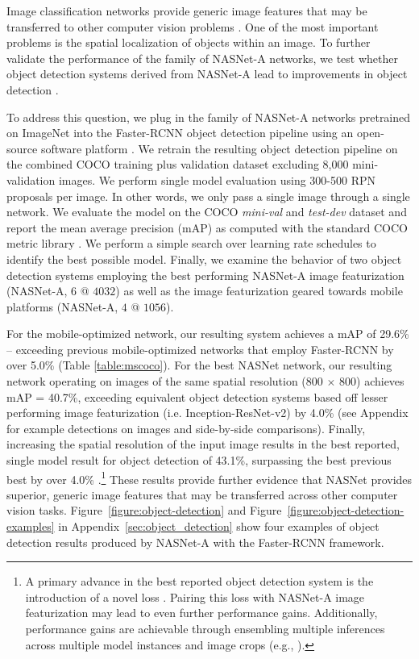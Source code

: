 \documentclass[10pt,twocolumn,letterpaper]{article}
\begin{document}
Image classification networks provide generic image features that may be transferred to other computer vision problems \cite{donahue2014decaf}. One of the most important problems is the spatial localization of objects within an image. To further validate the  performance of the family of NASNet-A networks, we test whether object detection systems derived from NASNet-A lead to improvements in object detection \cite{huang2016speed}.

To address this question, we plug in the family of NASNet-A networks pretrained on ImageNet into the Faster-RCNN object detection pipeline \cite{faster_rcnn} using an open-source software platform \cite{huang2016speed}. We retrain the resulting object detection pipeline on the combined COCO training plus validation dataset excluding 8,000 mini-validation images.
We perform single model evaluation using 300-500 RPN proposals per image. In other words, we only
pass a single image through a single network. We evaluate the model on the COCO {\it mini-val}\cite{huang2016speed} and {\it test-dev} dataset and report the mean average precision (mAP) as computed with the standard COCO metric library \cite{lin2014microsoft}. We perform a simple search over learning rate schedules to identify the best possible model. Finally, we examine the behavior of two object detection systems employing the best performing NASNet-A image featurization (NASNet-A, $6$ @ $4032$) as well as the image featurization geared towards mobile platforms (NASNet-A, $4$ @ $1056$).

For the mobile-optimized network, our resulting system achieves a mAP of 29.6\% -- exceeding previous mobile-optimized networks that employ Faster-RCNN by over 5.0\% (Table \ref{table:mscoco}). For the best NASNet network, our resulting network operating on images of the same spatial resolution (800 $\times$ 800) achieves mAP = 40.7\%, exceeding equivalent object detection systems based off lesser performing image featurization (i.e. Inception-ResNet-v2) by 4.0\% \cite{huang2016speed,shrivastava2016beyond} (see Appendix for example detections on images and side-by-side comparisons). Finally, increasing the spatial resolution of the input image results in the best reported, single model result for object detection of 43.1\%, surpassing the best previous best by over 4.0\% \cite{lin2017focal}.\footnote{A primary advance in the best reported object detection system is the introduction of a novel loss \cite{lin2017focal}. Pairing this loss with NASNet-A image featurization may lead to even further performance gains. Additionally, performance gains are achievable through ensembling multiple inferences across multiple model instances and image crops (e.g., \cite{huang2016speed}).} These results provide further evidence that NASNet provides superior, generic image features that may be transferred across other computer vision tasks. Figure~\ref{figure:object-detection} and Figure~\ref{figure:object-detection-examples} in Appendix~\ref{sec:object_detection} show four examples of object detection results produced by NASNet-A with the Faster-RCNN framework.
\end{document}
